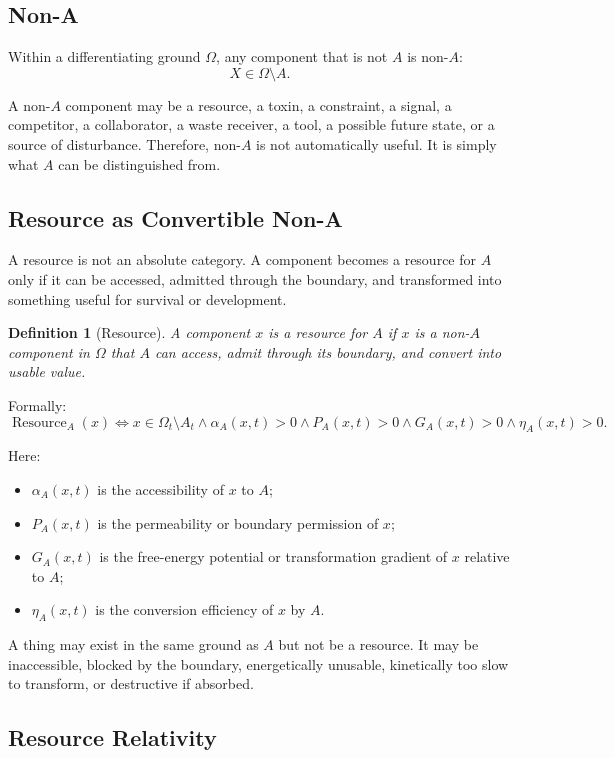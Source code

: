 \documentclass[11pt,a4paper]{article}
\newtheorem{definition}{Definition}
\newcommand{\Resource}{\operatorname{Resource}}
\begin{document}
\subsection{Non-A}

Within a differentiating ground $\Omega$, any component that is not $A$ is non-$A$:
\[
X\in\Omega\setminus A.
\]

A non-$A$ component may be a resource, a toxin, a constraint, a signal, a competitor, a collaborator, a waste receiver, a tool, a possible future state, or a source of disturbance. Therefore, non-$A$ is not automatically useful. It is simply what $A$ can be distinguished from.

\subsection{Resource as Convertible Non-A}

A resource is not an absolute category. A component becomes a resource for $A$ only if it can be accessed, admitted through the boundary, and transformed into something useful for survival or development.

\begin{definition}[Resource]
A component $x$ is a resource for $A$ if $x$ is a non-$A$ component in $\Omega$ that $A$ can access, admit through its boundary, and convert into usable value.
\end{definition}

Formally:
\[
\Resource_A(x)
\Longleftrightarrow
x\in\Omega_t\setminus A_t
\wedge
\alpha_A(x,t)>0
\wedge
P_A(x,t)>0
\wedge
G_A(x,t)>0
\wedge
\eta_A(x,t)>0.
\]

Here:
\begin{itemize}[leftmargin=2em]
\item $\alpha_A(x,t)$ is the accessibility of $x$ to $A$;
\item $P_A(x,t)$ is the permeability or boundary permission of $x$;
\item $G_A(x,t)$ is the free-energy potential or transformation gradient of $x$ relative to $A$;
\item $\eta_A(x,t)$ is the conversion efficiency of $x$ by $A$.
\end{itemize}

A thing may exist in the same ground as $A$ but not be a resource. It may be inaccessible, blocked by the boundary, energetically unusable, kinetically too slow to transform, or destructive if absorbed.

\subsection{Resource Relativity}
\end{document}
